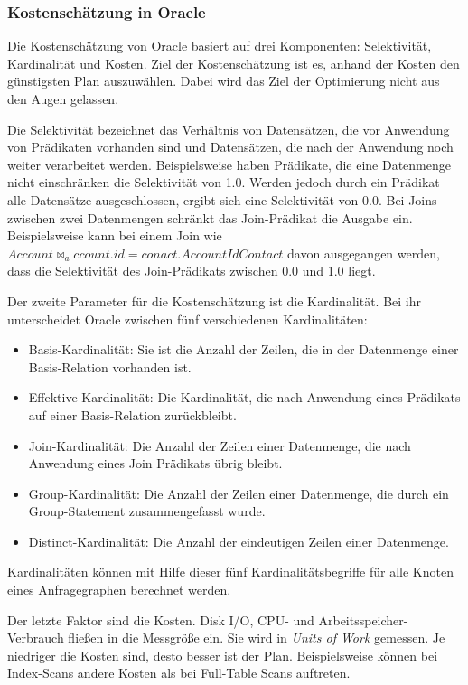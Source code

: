 \subsubsection{Kostenschätzung in Oracle}
Die Kostenschätzung von Oracle basiert auf drei Komponenten: Selektivität, Kardinalität und Kosten. Ziel der Kostenschätzung ist es, anhand der Kosten den günstigsten Plan auszuwählen. Dabei wird das Ziel der Optimierung nicht aus den Augen gelassen.

Die Selektivität bezeichnet das Verhältnis von Datensätzen, die vor Anwendung von Prädikaten vorhanden sind und Datensätzen, die nach der Anwendung noch weiter verarbeitet werden. Beispielsweise haben Prädikate, die eine Datenmenge nicht einschränken die Selektivität von 1.0. Werden jedoch durch ein Prädikat alle Datensätze ausgeschlossen, ergibt sich eine Selektivität von 0.0. Bei Joins zwischen zwei Datenmengen schränkt das Join-Prädikat die Ausgabe ein. Beispielsweise kann bei einem Join wie $Account \Join_account.id=conact.AccountId Contact$ davon ausgegangen werden, dass die Selektivität des Join-Prädikats zwischen 0.0 und 1.0 liegt.

Der zweite Parameter für die Kostenschätzung ist die Kardinalität. Bei ihr unterscheidet Oracle zwischen fünf verschiedenen Kardinalitäten:

\begin{itemize}
\item Basis-Kardinalität: Sie ist die Anzahl der Zeilen, die in der Datenmenge einer Basis-Relation vorhanden ist.
\item Effektive Kardinalität: Die Kardinalität, die nach Anwendung eines Prädikats auf einer Basis-Relation zurückbleibt.
\item Join-Kardinalität: Die Anzahl der Zeilen einer Datenmenge, die nach Anwendung eines Join Prädikats übrig bleibt.
\item Group-Kardinalität: Die Anzahl der Zeilen einer Datenmenge, die durch ein Group-Statement zusammengefasst wurde.
\item Distinct-Kardinalität: Die Anzahl der eindeutigen Zeilen einer Datenmenge.
\end{itemize}

Kardinalitäten können mit Hilfe dieser fünf Kardinalitätsbegriffe für alle Knoten eines Anfragegraphen berechnet werden.

Der letzte Faktor sind die Kosten. Disk I/O, CPU- und Arbeitsspeicher-Verbrauch fließen in die Messgröße ein. Sie wird in \textit{Units of Work} gemessen. Je niedriger die Kosten sind, desto besser ist der Plan. Beispielsweise können bei Index-Scans andere Kosten als bei Full-Table Scans auftreten.






